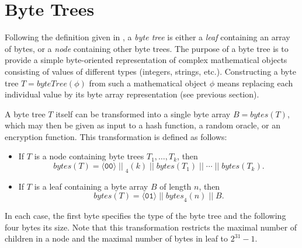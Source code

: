 \documentclass[bibtotoc,halfparskip,oneside]{scrreprt}
\newcommand{\hex}[1]{\ensuremath{\mathtt{#1}}}
\newcommand{\conc}{\ensuremath{\;||\;}}
\begin{document}
	\section{Byte Trees}
	
	Following the definition given in \cite{wikstrom12}, a \emph{byte tree} is either a \emph{leaf} containing an array of bytes, or a \emph{node} containing other byte trees. The purpose of a byte tree is to provide a simple byte-oriented representation of complex mathematical objects consisting of values of different types (integers, strings, etc.). Constructing a byte tree $T=\mathit{byteTree}(\phi)$ from such a mathematical object $\phi$ means replacing each individual value by its byte array representation (see previous section). 
	
	A byte tree $T$ itself can be transformed into a single byte array $B=\mathit{bytes}(T)$, which may then be given as input to a hash function, a random oracle, or an encryption function. This transformation is defined as follows:
	\begin{itemize}
		\item If $T$ is a node containing byte trees $T_1,\ldots,T_k$, then $$\mathit{bytes}(T)=\langle\hex{00}\rangle\conc _4(k)\conc \mathit{bytes}(T_1)\conc \cdots\conc \mathit{bytes}(T_k).$$
		\item If $T$ is a leaf containing a byte array $B$ of length $n$, then $$\mathit{bytes}(T)=\langle\hex{01}\rangle\conc \mathit{bytes}_4(n)\conc B.$$
	\end{itemize}
	In each case, the first byte specifies the type of the byte tree and the following four bytes its size. Note that this transformation restricts the maximal number of children in a node and the maximal number of bytes in leaf to $2^{31}-1$.
	
\end{document}
